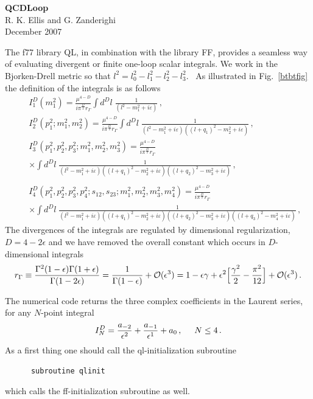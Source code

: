 \documentclass{article}
\def\cG{r_\Gamma}
\def\nn{\nonumber}
\def\beq{\begin{displaymath}}
\def\eeq{\end{displaymath}}
\def\e{\epsilon}
\begin{document}
\begin{center}
{\bf \Large QCDLoop}\\
\vspace{0.3cm}
{\Large R. K. Ellis and G. Zanderighi}\\
\vspace{0.3cm}
December 2007
\end{center}

The f77 library QL, in combination with the library FF, provides
a seamless way of evaluating divergent or finite one-loop scalar
integrals.  We work in the Bjorken-Drell metric so that
$l^2=l_0^2-l_1^2-l_2^2-l_3^2$. \ As illustrated in Fig.~\ref{btbtfig}
the definition of the integrals is as follows
\begin{eqnarray}
&& I^{D}_1(m_1^2)  =
 \frac{\mu^{4-D}}{i \pi^{\frac{D}{2}}\cG}\int d^D l \;
 \frac{1}{(l^2-m_1^2+i\varepsilon)}\,, \nn \\
&& I^{D}_2(p_1^2;m_1^2,m_2^2)  =
 \frac{\mu^{4-D}}{i \pi^{\frac{D}{2}}\cG}\int d^D l \;
 \frac{1}
{(l^2-m_1^2+i\varepsilon)
((l+q_1)^2-m_2^2+i\varepsilon)}\,,\nn \\
&& I^{D}_3(p_1^2,p_2^2,p_3^2;m_1^2,m_2^2,m_3^2)  =
\frac{\mu^{4-D}}{i \pi^{\frac{D}{2}}\cG}
\nn \\
&& \times \int d^D l \;
 \frac{1}
{(l^2-m_1^2+i\varepsilon)
((l+q_1)^2-m_2^2+i\varepsilon)
((l+q_2)^2-m_3^2+i\varepsilon)}\,,\nn \\
&&\nn \\
&&
I^{D}_4(p_1^2,p_2^2,p_3^2,p_4^2;s_{12},s_{23};m_1^2,m_2^2,m_3^2,m_4^2)
= 
\frac{\mu^{4-D}}{i \pi^{\frac{D}{2}}\cG}
\nn \\
&&
\times \int d^D l \;
 \frac{1}
{(l^2-m_1^2+i\varepsilon)
((l+q_1)^2-m_2^2+i\varepsilon)
((l+q_2)^2-m_3^2+i\varepsilon)
((l+q_3)^2-m_4^2+i\varepsilon)}\,, \nn 
\end{eqnarray}
The divergences of the integrals are regulated by dimensional
regularization, $D=4-2 \epsilon$ and we have removed the overall
constant which occurs in $D$-dimensional integrals
\beq
\cG\equiv\frac{\Gamma^2(1-\e)\Gamma(1+\e)}{\Gamma(1-2\e)} = 
\frac{1}{\Gamma(1-\e)} +{\cal O}(\e^3) =
1-\e \gamma+\e^2\Big[\frac{\gamma^2}{2}-\frac{\pi^2}{12}\Big]
+{\cal O}(\e^3)\,.
\nn
\eeq

The numerical code returns the three complex coefficients in the
Laurent series, for any $N$-point integral
\beq
I_N^D = \frac{a_{-2}}{\e^2}+\frac{a_{-1}}{\e^1}+a_0\,,\hspace{.5cm} N\leq 4 \,. 
\nn
\eeq
%
As a first thing one should call the ql-initialization subroutine 
\begin{verbatim}
      subroutine qlinit
\end{verbatim}
which calls the ff-initialization subroutine as well. 
\end{document}
